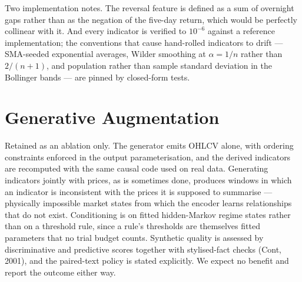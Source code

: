 \documentclass[10pt,a4paper]{article}
\begin{document}
Two implementation notes. The reversal feature is defined as a sum of overnight
gaps rather than as the negation of the five-day return, which would be
perfectly collinear with it. And every indicator is verified to $10^{-6}$
against a reference implementation; the conventions that cause hand-rolled
indicators to drift --- SMA-seeded exponential averages, Wilder smoothing at
$\alpha=1/n$ rather than $2/(n+1)$, and population rather than sample standard
deviation in the Bollinger bands --- are pinned by closed-form tests.


\section{Generative Augmentation}
\label{app:gan}

Retained as an ablation only. The generator emits OHLCV alone, with ordering
constraints enforced in the output parameterisation, and the derived indicators
are recomputed with the same causal code used on real data. Generating
indicators jointly with prices, as is sometimes done, produces windows in which
an indicator is inconsistent with the prices it is supposed to summarise ---
physically impossible market states from which the encoder learns relationships
that do not exist. Conditioning is on fitted hidden-Markov regime states rather
than on a threshold rule, since a rule's thresholds are themselves fitted
parameters that no trial budget counts. Synthetic quality is assessed by
discriminative and predictive scores together with stylised-fact checks
(Cont, 2001), and the paired-text policy is stated explicitly. We
expect no benefit and report the outcome either way.

\footnotesize
\setlength{\itemsep}{1pt}
\end{document}
